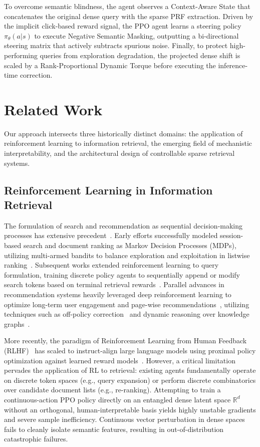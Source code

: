 To overcome semantic blindness, the agent observes a Context-Aware State that concatenates the original dense query with the sparse PRF extraction. Driven by the implicit click-based reward signal, the PPO agent learns a steering policy $\pi_\theta(a|s)$ to execute Negative Semantic Masking, outputting a bi-directional steering matrix that actively subtracts spurious noise. Finally, to protect high-performing queries from exploration degradation, the projected dense shift is scaled by a Rank-Proportional Dynamic Torque before executing the inference-time correction.

\section{Related Work}
Our approach intersects three historically distinct domains: the application of reinforcement learning to information retrieval, the emerging field of mechanistic interpretability, and the architectural design of controllable sparse retrieval systems.

\subsection{Reinforcement Learning in Information Retrieval}
The formulation of search and recommendation as sequential decision-making processes has extensive precedent~\citep{afsar2022}. Early efforts successfully modeled session-based search and document ranking as Markov Decision Processes (MDPs), utilizing multi-armed bandits to balance exploration and exploitation in listwise ranking~\citep{hofmann2013, wei2017, hu2018}. Subsequent works extended reinforcement learning to query formulation, training discrete policy agents to sequentially append or modify search tokens based on terminal retrieval rewards~\citep{nogueira2017, buck2018}. Parallel advances in recommendation systems heavily leveraged deep reinforcement learning to optimize long-term user engagement and page-wise recommendations~\citep{ouyang2021, zou2019, zheng2018, zhao2018}, utilizing techniques such as off-policy correction~\citep{chen2019} and dynamic reasoning over knowledge graphs~\citep{yao2018}.

More recently, the paradigm of Reinforcement Learning from Human Feedback (RLHF)~\citep{christiano2017} has scaled to instruct-align large language models using proximal policy optimization against learned reward models~\citep{ouyang2022, stiennon2020, bai2022, ziegler2019}. However, a critical limitation pervades the application of RL to retrieval: existing agents fundamentally operate on discrete token spaces (e.g., query expansion) or perform discrete combinatorics over candidate document lists (e.g., re-ranking). Attempting to train a continuous-action PPO policy directly on an entangled dense latent space $\mathbb{R}^d$ without an orthogonal, human-interpretable basis yields highly unstable gradients and severe sample inefficiency. Continuous vector perturbation in dense spaces fails to cleanly isolate semantic features, resulting in out-of-distribution catastrophic failures.

